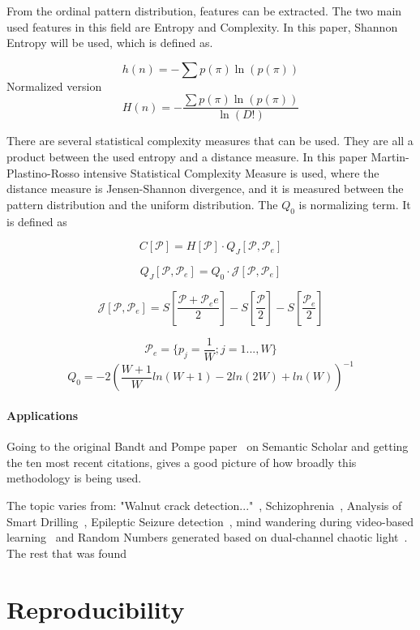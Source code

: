 From the ordinal pattern distribution, features can be extracted. The two main used features in this field are Entropy and Complexity. In this paper, Shannon Entropy will be used, which is defined as.

$$h(n)=-\sum p(\pi) \ln(p(\pi))$$
Normalized version
$$H(n)=-\frac{\sum p(\pi) \ln(p(\pi))}{\ln(D!)}$$

There are several statistical complexity measures that can be used. They are all a product between the used entropy and a distance measure. In this paper Martin-Plastino-Rosso intensive Statistical Complexity Measure is used, where the distance measure is Jensen-Shannon divergence, and it is measured between the pattern distribution and the uniform distribution. The $Q_0$ is normalizing term. It is defined as

$$C[\mathscr{P}]=H[\mathscr{P}]\cdot Q_J[\mathscr{P},\mathscr{P}_e]$$

$$Q_J[\mathscr{P},\mathscr{P}_e]=Q_0\cdot \mathscr{J}[\mathscr{P},\mathscr{P}_e]$$

$$\mathscr{J}[\mathscr{P},\mathscr{P}_e]=S[\frac{\mathscr{P}+\mathscr{P}_ee}{2}]-S[\frac{\mathscr{P}}{2}]-S[\frac{\mathscr{P}_e}{2}]$$

$$\mathscr{P}_e=\{p_j=\frac{1}{W};j=1...,W\}$$
$$Q_0 = -2(\frac{W+1}{W}ln(W+1)-2ln(2W)+ln(W))^{-1}$$
\cite{Amigo2023b}

\paragraph{Applications}
Going to the original Bandt and Pompe paper~\cite{Bandt2002} on Semantic Scholar and getting the ten most recent citations, gives a good picture of how broadly this methodology is being used.

The topic varies from: "Walnut crack detection..."~\cite{Zhang2024}, Schizophrenia~\cite{Wang2024}, Analysis of Smart Drilling~\cite{Szwajka2024}, Epileptic Seizure detection~\cite{AbhishekParikh2024}, mind wandering during video-based learning~\cite{Tang2024} and Random Numbers generated based on dual-channel chaotic light~\cite{Liu2024}. The rest that was found~\cite{Demirel2024, Du2024, Sun2024, Li2024}

\section{Reproducibility}
